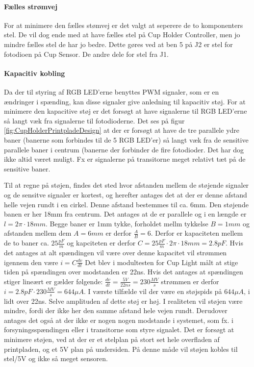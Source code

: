 \documentclass[HardwareDesign/HardwareDesign_main.tex]{subfiles}
\begin{document}
\paragraph{Fælles strømvej} For at minimere den fælles stømvej er det valgt at seperere de to komponenters stel. De vil dog ende med at have fælles stel på Cup Holder Controller, men jo mindre fælles stel de har jo bedre. Dette gøres ved at ben 5 på J2 er stel for fotodioen på Cup Sensor. De andre dele for stel fra J1. 

\paragraph{Kapacitiv kobling} Da der til styring af RGB LED'erne benyttes PWM signaler, som er en ændringer i spænding, kan disse signaler give anledning til kapacitiv støj. For at minimere den kapacitive støj er det forsøgt at have signalerne til RGB LED'erne så langt væk fra signalerne til fotodioderne. Det ses på figur \ref{fig:CupHolderPrintpladeDesign} at der er forsøgt at have de tre parallele ydre baner (banerne som forbindes til de 5 RGB LED'er) så langt væk fra de sensitive parallele baner i centrum (banerne der forbinder de fire fotodioder. Det har dog ikke altid været muligt. Fx er signalerne på transitorne meget relativt tæt på de sensitive baner.

Til at regne på støjen, findes det sted hvor afstanden mellem de støjende signaler og de sensitve signaler er kortest, og herefter antages det at der er denne afstand helle vejen rundt i en cirkel. Denne afstand bestemmes til ca. 6mm. Den støjende banen er her 18mm fra centrum. Det antages at de er parallele og i en længde er $l = 2\pi\cdot18\si{mm}$. Begge baner er 1mm tykke, forholdet mellm tykkelse $B=1\si{mm}$ og afstanden mellem dem $A=6\si{mm}$ er derfor $\frac{A}{B} = 6$. Derfor er kapaciteten mellem de to baner ca. $25\si{\frac{pF}{m}}$ og kapciteten er derfor $C=25\si{\frac{pF}{m}}\cdot2\pi\cdot18\si{mm} = 2.8 pF$. Hvis det antages at alt spændingen vil være over denne kapacitet vil strømmen igennem den være $i = C \frac{dv}{dt}$ Det blev i modultesten for Cup Light målt at stige tiden på spændingen over modstanden er 22ns. Hvis det antages at spændingen stiger lineært er gælder følgende: $\frac{dv}{dt} = \frac{5\si{V}}{22\si{ns}} = 230\si{\frac{MV}{s}}$
strømmen er derfor $i = 2.8pF \cdot 230\si{\frac{MV}{s}} = 644\si{\mu A}$. I værste tilfælde vil der være en støjspids på $644\si{\mu A}$, i lidt over 22ns. Selve amplituden af dette støj er høj. I realiteten vil støjen være mindre, fordi der ikke her den samme afstand hele vejen rundt. Derudover antages det også at der ikke er nogen nogen modstande i systemet, som fx. i forsyningsspændingen eller i transitorne som styre signalet. Det er forsøgt at minimere støjen, ved at der er et stelplan på stort set hele overfladen af printpladen, og et 5V plan på undersiden. På denne måde vil støjen kobles til stel/5V og ikke så meget sensoren.
\end{document}
